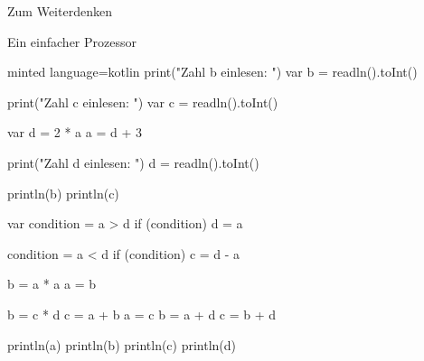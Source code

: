 \begin{task}[points=auto]{Zum Weiterdenken }
\begin{subtask*}[points=0]{Ein einfacher Prozessor}
\begin{solution}
\begin{codeBlock}[]{minted language=kotlin}
                print("Zahl b einlesen: ")
                var b = readln().toInt()

                print("Zahl c einlesen: ")
                var c = readln().toInt()

                var d = 2 * a
                a = d + 3

                print("Zahl d einlesen: ")
                d = readln().toInt()

                println(b)
                println(c)

                var condition = a > d
                if (condition) {
                    d = a
                }

                condition = a < d
                if (condition) {
                    c = d - a
                }

                b = a * a
                a = b

                b = c * d
                c = a + b
                a = c
                b = a + d
                c = b + d

                println(a)
                println(b)
                println(c)
                println(d)
            \end{codeBlock}
        \end{solution}
    \end{subtask*}
\end{task}


